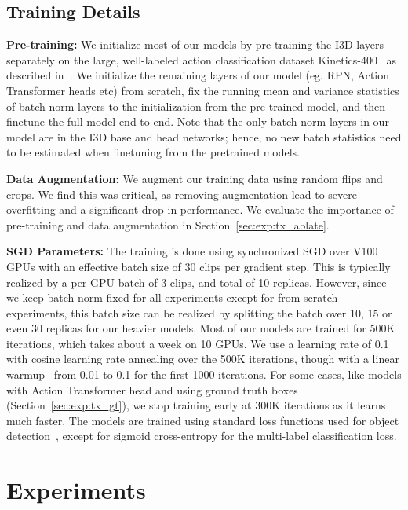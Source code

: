 \documentclass[10pt,twocolumn,letterpaper]{article}
\newcommand{\Tx}[0]{Action Transformer}
\begin{document}
\subsection{Training Details}\label{sec:app:train}



{\noindent \bf Pre-training:} 
We initialize most of our models by
pre-training the I3D layers separately on the large,
well-labeled action classification dataset Kinetics-400~\cite{kay2017kinetics} as described in~\cite{carreira2017quo}.
We initialize the remaining layers of our model (eg. RPN, \Tx{} heads etc) from
scratch, fix the running mean and variance statistics of batch norm layers to
the initialization from the pre-trained model,
and then finetune the full model end-to-end.
Note that the only batch norm layers in our model are in the I3D base and head networks;
hence, no new batch statistics need to be estimated when finetuning from the pretrained models.

{\noindent \bf Data Augmentation:} We augment our training data using random flips and crops. We find this was critical, as removing augmentation lead to severe overfitting and a significant drop in performance.
We evaluate the importance of pre-training and data augmentation in Section~\ref{sec:exp:tx_ablate}.


{\noindent \bf SGD Parameters:} The training is done using
synchronized SGD over V100 GPUs with an effective batch size of 30
clips per gradient step. This is typically realized by a per-GPU batch
of 3 clips, and total of 10 replicas. However, since we keep batch
norm fixed for all experiments except for from-scratch experiments,
this batch size can be realized by
splitting the batch over 10, 15 or even 30 replicas for our heavier
models. 
Most of our models are trained for 500K iterations, which
takes about a week on 10 GPUs. We use a learning rate of 0.1 with
cosine learning rate annealing over the 500K iterations, though with a
linear warmup~\cite{goyal2017accurate} from 0.01 to 0.1 for the first
1000 iterations.  For some cases, like models with \Tx{} head and
using ground truth boxes
(Section~\ref{sec:exp:tx_gt}), we stop training early at 300K
iterations as it learns much faster.  The models are trained using
standard loss functions used for object
detection~\cite{huang2017speed}, except for sigmoid cross-entropy for the multi-label classification loss.

 \section{Experiments}\label{sec:exp}
\end{document}
